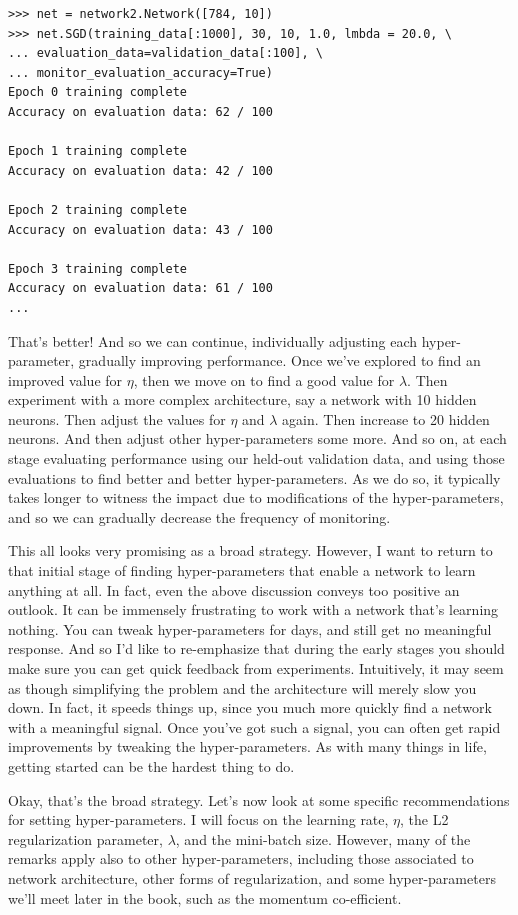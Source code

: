 \documentclass[a4paper,twoside,10pt]{book}
\begin{document}
\begin{lstlisting}
>>> net = network2.Network([784, 10])
>>> net.SGD(training_data[:1000], 30, 10, 1.0, lmbda = 20.0, \
... evaluation_data=validation_data[:100], \
... monitor_evaluation_accuracy=True)
Epoch 0 training complete
Accuracy on evaluation data: 62 / 100

Epoch 1 training complete
Accuracy on evaluation data: 42 / 100

Epoch 2 training complete
Accuracy on evaluation data: 43 / 100

Epoch 3 training complete
Accuracy on evaluation data: 61 / 100
...

\end{lstlisting}
That's better! And so we can continue, individually adjusting each hyper-parameter, gradually improving performance. Once we've explored to find an improved value for $\eta$, then we move on to find a good value for $\lambda$. Then experiment with a more complex architecture, say a network with 10 hidden neurons. Then adjust the values for $\eta$ and $\lambda$ again. Then increase to 20 hidden neurons. And then adjust other hyper-parameters some more. And so on, at each stage evaluating performance using our held-out validation data, and using those evaluations to find better and better hyper-parameters. As we do so, it typically takes longer to witness the impact due to modifications of the hyper-parameters, and so we can gradually decrease the frequency of monitoring.

This all looks very promising as a broad strategy. However, I want to return to that initial stage of finding hyper-parameters that enable a network to learn anything at all. In fact, even the above discussion conveys too positive an outlook. It can be immensely frustrating to work with a network that's learning nothing. You can tweak hyper-parameters for days, and still get no meaningful response. And so I'd like to re-emphasize that during the early stages you should make sure you can get quick feedback from experiments. Intuitively, it may seem as though simplifying the problem and the architecture will merely slow you down. In fact, it speeds things up, since you much more quickly find a network with a meaningful signal. Once you've got such a signal, you can often get rapid improvements by tweaking the hyper-parameters. As with many things in life, getting started can be the hardest thing to do.

Okay, that's the broad strategy. Let's now look at some specific recommendations for setting hyper-parameters. I will focus on the learning rate, $\eta$, the L2 regularization parameter, $\lambda$, and the mini-batch size. However, many of the remarks apply also to other hyper-parameters, including those associated to network architecture, other forms of regularization, and some hyper-parameters we'll meet later in the book, such as the momentum co-efficient.
\end{document}
